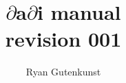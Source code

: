 \documentclass{report}
\newcommand{\dadi}{$\partial$a$\partial$i\xspace}
\begin{document}
\title{\dadi manual\\\normalsize revision 001}
\author{Ryan Gutenkunst}
\maketitle
\end{document}
